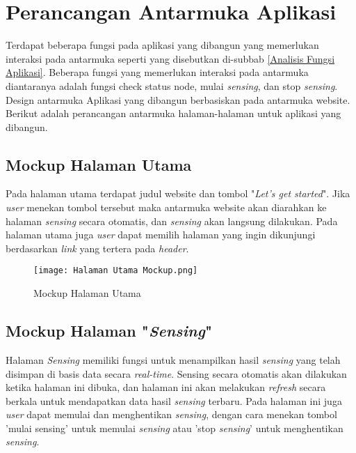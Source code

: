  
  

\section{Perancangan Antarmuka Aplikasi}
\label{sec:latex}

    Terdapat beberapa fungsi pada aplikasi yang dibangun yang memerlukan interaksi pada antarmuka seperti yang disebutkan di-subbab \ref{Analisis Fungsi Aplikasi}. Beberapa fungsi yang memerlukan interaksi pada antarmuka diantaranya adalah fungsi check status node, mulai \textit{sensing}, dan stop \textit{sensing}. Design antarmuka Aplikasi yang dibangun berbasiskan pada antarmuka website. Berikut adalah perancangan antarmuka halaman-halaman untuk aplikasi yang dibangun.
    
    \subsection{Mockup Halaman Utama}
    Pada halaman utama terdapat judul website dan tombol "\textit{Let's get started}". Jika \textit{user} menekan tombol tersebut maka antarmuka website akan diarahkan ke halaman \textit{sensing} secara otomatis, dan \textit{sensing} akan langsung dilakukan. Pada halaman utama juga \textit{user} dapat memilih halaman yang ingin dikunjungi berdasarkan \textit{link} yang tertera pada
    \textit{header}.
    
    \begin{figure}[H]
    	\centering  
    	\texttt{[image: Halaman Utama Mockup.png]}  
    	\caption[Mockup Halaman Utama]{Mockup Halaman Utama} 
    	\label{fig:Mockup Halaman Utama} 
    \end{figure}
   
   \subsection{Mockup Halaman "\textit{Sensing}"}
   Halaman \textit{Sensing} memiliki fungsi untuk menampilkan hasil \textit{sensing} yang telah disimpan di basis data secara \textit{real-time}. 
   Sensing secara otomatis akan dilakukan ketika halaman ini dibuka, dan halaman ini akan melakukan \textit{refresh} secara berkala untuk mendapatkan data hasil \textit{sensing} terbaru. Pada halaman ini juga \textit{user} dapat memulai dan menghentikan \textit{sensing}, dengan cara menekan tombol 'mulai sensing' untuk memulai \textit{sensing} atau 'stop \textit{sensing}' untuk menghentikan \textit{sensing}.
   

